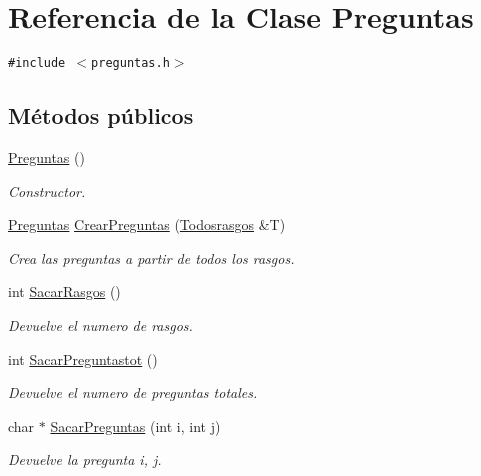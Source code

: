 \hypertarget{class_preguntas}{
\section{Referencia de la Clase Preguntas}
\label{class_preguntas}
}
{\tt \#include $<$preguntas.h$>$}

\subsection*{Métodos públicos}
\begin{CompactItemize}
\item 
\hyperlink{class_preguntas_6aeb6fde2e549ae6f3ac34ab2c255ab7}{Preguntas} ()
\begin{CompactList}\small\item\em Constructor. \item\end{CompactList}\item 
\hyperlink{class_preguntas}{Preguntas} \hyperlink{class_preguntas_3a3fa67dfed70abb2b102192d4057070}{CrearPreguntas} (\hyperlink{class_todosrasgos}{Todosrasgos} \&T)
\begin{CompactList}\small\item\em Crea las preguntas a partir de todos los rasgos. \item\end{CompactList}\item 
int \hyperlink{class_preguntas_4e3802ae1037d3837087242c9185fee7}{SacarRasgos} ()
\begin{CompactList}\small\item\em Devuelve el numero de rasgos. \item\end{CompactList}\item 
int \hyperlink{class_preguntas_2e3a06157b2c7dc8ed1de3e32d20fd6d}{SacarPreguntastot} ()
\begin{CompactList}\small\item\em Devuelve el numero de preguntas totales. \item\end{CompactList}\item 
char $\ast$ \hyperlink{class_preguntas_d624e3ca649ba38d0f40ae8751353003}{SacarPreguntas} (int i, int j)
\begin{CompactList}\small\item\em Devuelve la pregunta i, j. \item\end{CompactList}\item 

\end{CompactItemize}
